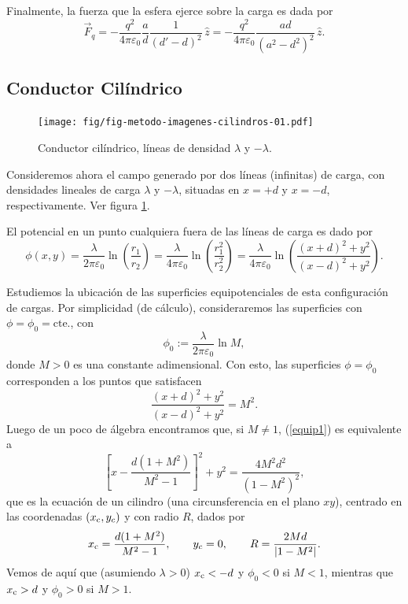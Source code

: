 Finalmente, la fuerza que la esfera ejerce sobre la carga es dada por
\begin{equation}
\vec{F}_q=-\frac{q^2}{4\pi\varepsilon_0}\frac{a}{d}\frac{1}{(d'-d)^2}\,
\hat{z}=-\frac { q^2 }{4\pi\varepsilon_0}\frac{ad}{(a^2-d^2)^2}\,\hat{z}.
\end{equation}

\subsection{Conductor Cilíndrico}
\begin{figure}[!h]
\centerline{\texttt{[image: fig/fig-metodo-imagenes-cilindros-01.pdf]}}
\caption{Conductor cilíndrico, líneas de densidad $\lambda$ y $-\lambda$.}
\label{ci03}
\end{figure}
Consideremos ahora el campo generado por dos líneas (infinitas) de carga, con
densidades lineales de carga $\lambda$ y $-\lambda$, situadas en $x=+d$ y
$x=-d$, respectivamente. Ver figura \ref{ci03}.

El potencial en un punto cualquiera fuera de las líneas de carga es dado por
\begin{equation}
 \phi(x,y)=\frac{\lambda}{2\pi\varepsilon_0}\ln\left(\frac{r_1}{r_2}
\right)=\frac{\lambda}{4\pi\varepsilon_0}\ln\left(\frac{r_1^2}{r_2^2}
\right)=\frac{\lambda}{4\pi\varepsilon_0}\ln\left(\frac{(x+d)^2+y^2}{
(x-d)^2+y^2}\right).
\end{equation}

Estudiemos la ubicación de las superficies equipotenciales de esta
configuración de cargas. Por simplicidad (de cálculo), consideraremos las superficies con $\phi=\phi_0=\text{cte.}$, con
\begin{equation}
 \phi_0:=\frac{\lambda}{2\pi\varepsilon_0}\ln M, \label{phi0M}
\end{equation}
donde $M>0$ es una constante adimensional.  Con esto, las superficies $\phi=\phi_0$
corresponden a los puntos que satisfacen
\begin{equation}
 \frac{(x+d)^2+y^2}{(x-d)^2+y^2}=M^2. \label{equip1}
\end{equation}
Luego de un poco de álgebra encontramos que, si $M\neq 1$, (\ref{equip1}) es
equivalente a
\begin{equation}
 \left[x-\frac{d(1+M^2)}{M^2-1}\right]^2+y^2=\frac{4M^2d^2}{(1-M^2)^2},
\end{equation}
que es la ecuación de un cilindro (una circunsferencia en el plano $xy$),
centrado en las coordenadas $(x_{\rm c},y_c)$ y con radio $R$, dados por
\begin{equation}
 x_{\rm c}=\frac{d(1+M^2)}{M^2-1}, \qquad y_c=0, \qquad R=\frac{2Md}{|1-M^2|}.
\label{cilim}
\end{equation}
Vemos de aquí que (asumiendo $\lambda>0$) $x_{\rm c}<-d$ y $\phi_0<0$ si $M<1$,
mientras que $x_{\rm c}>d$ y $\phi_0>0$ si $M>1$.

